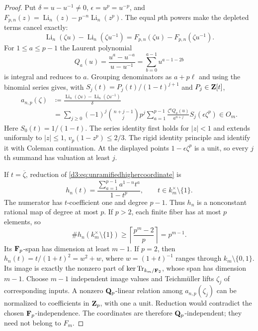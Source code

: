 \begin{proof}
Put $\delta=u-u^{-1}\ne0$, $\epsilon=u^p=u^{-p}$, and
$F_{p,n}(z)=\operatorname{Li}_n(z)-p^{-n}\operatorname{Li}_n(z^p)$.
The equal $p$th powers make the depleted terms cancel exactly:
\[
 \operatorname{Li}_n(\zeta u)-\operatorname{Li}_n(\zeta u^{-1})
 =F_{p,n}(\zeta u)-F_{p,n}(\zeta u^{-1}).
\]
For $1\leq a\leq p-1$ the Laurent polynomial
\[
 Q_a(u)=\frac{u^a-u^{-a}}{u-u^{-1}}
       =\sum_{b=0}^{a-1}u^{a-1-2b}
\]
is integral and reduces to $a$.
Grouping denominators as $a+p\ell$ and using the binomial series
gives, with $S_j(t)=P_j(t)/(1-t)^{j+1}$ and $P_j\in\mathbf Z[t]$,
\begin{equation}\label{d3:eq:unramifiedhighercoordinate}
\begin{split}
 a_{n,p}(\zeta)
 &\coloneqq\frac{\operatorname{Li}_n(\zeta u)
                   -\operatorname{Li}_n(\zeta u^{-1})}{\delta}\\
 &=\sum_{j\geq0}(-1)^j\binom{n+j-1}{j}p^j
       \sum_{a=1}^{p-1}\frac{\zeta^aQ_a(u)}{a^{n+j}}
                              S_j(\epsilon\zeta^p)\in O_m.
\end{split}
\end{equation}
Here $S_0(t)=1/(1-t)$.
The series identity first holds for $|z|<1$ and extends uniformly
to $|z|\leq1$, $v_p(1-z^p)\leq2/3$.
The rigid identity principle and
\cite[Theorem~2.7(3)]{BesserDeJeuAlgorithm} identify it with Coleman
continuation. At the displayed points $1-\epsilon\zeta^p$ is a unit,
so every $j$th summand has valuation at least $j$.

If $t=\overline\zeta$, reduction of
\eqref{d3:eq:unramifiedhighercoordinate} is
\[
 h_n(t)=\frac{\sum_{a=1}^{p-1}a^{1-n}t^a}{1-t^p},
 \qquad t\in k_m^\times\setminus\{1\}.
\]
The numerator has $t$-coefficient one and degree $p-1$.
Thus $h_n$ is a nonconstant rational map of degree at most $p$.
If $p>2$, each finite fiber has at most $p$ elements, so
\[
 \#h_n(k_m^\times\setminus\{1\})
 \geq\left\lceil\frac{p^m-2}{p}\right\rceil=p^{m-1}.
\]
Its $\mathbf F_p$-span has dimension at least $m-1$.
If $p=2$, then $h_n(t)=t/(1+t)^2=w^2+w$, where
$w=(1+t)^{-1}$ ranges through $k_m\setminus\{0,1\}$.
Its image is exactly the nonzero part of
$\ker\operatorname{Tr}_{k_m/\mathbf F_2}$, whose span has dimension $m-1$.
Choose $m-1$ independent image values and Teichm\"uller lifts
$\zeta_j$ of corresponding inputs.
A nonzero $\mathbf Q_p$-linear relation among $a_{n,p}(\zeta_j)$ can
be normalized to coefficients in $\mathbf Z_p$, with one a unit.
Reduction would contradict the chosen $\mathbf F_p$-independence.
The coordinates are therefore $\mathbf Q_p$-independent; they need not
belong to $F_m$.


\end{proof}
